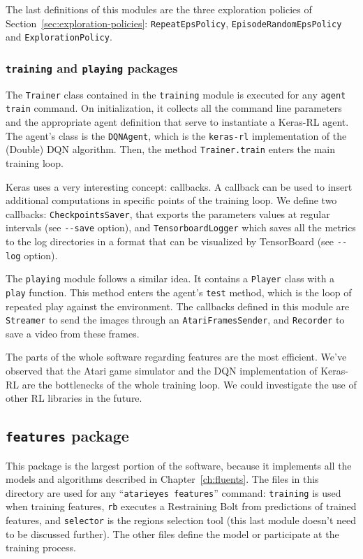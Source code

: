 The last definitions of this modules are the three exploration policies of
Section~\ref{sec:exploration-policies}: \texttt{RepeatEpsPolicy},
\texttt{EpisodeRandomEpsPolicy} and \texttt{ExplorationPolicy}.


\subsubsection*{\texttt{training} and \texttt{playing} packages}

The \texttt{Trainer} class contained in the \texttt{training} module is
executed for any \lstinline[style=inlinepy]|agent train| command. On
initialization, it collects all the command line parameters and the
appropriate agent definition that serve to instantiate a Keras-RL agent. The
agent's class is the \texttt{DQNAgent}, which is the \texttt{keras-rl}
implementation of the (Double) DQN algorithm. Then, the method
\verb|Trainer.train| enters the main training loop.

Keras uses a very interesting concept: callbacks. A callback can be used to
insert additional computations in specific points of the training loop.  We
define two callbacks: \texttt{CheckpointsSaver}, that exports the parameters
values at regular intervals (see \verb|--save| option), and
\texttt{TensorboardLogger} which saves all the metrics to the log directories
in a format that can be visualized by TensorBoard (see \verb|--log| option).

The \texttt{playing} module follows a similar idea. It contains a
\texttt{Player} class with a \texttt{play} function. This method enters the
agent's \texttt{test} method, which is the loop of repeated play against the
environment. The callbacks defined in this module are \texttt{Streamer} to
send the images through an \texttt{AtariFramesSender}, and \texttt{Recorder}
to save a video from these frames.

The parts of the whole software regarding features are the most efficient.
We've observed that the Atari game simulator and the DQN implementation of
Keras-RL are the bottlenecks of the whole training loop. We could investigate
the use of other RL libraries in the future.


\subsection{\texttt{features} package}

This package is the largest portion of the software, because it implements all
the models and algorithms described in Chapter~\ref{ch:fluents}. The files in
this directory are used for any
``\lstinline[style=inlinesh]|atarieyes features|'' command: \texttt{training}
is used when training features, \texttt{rb} executes a Restraining Bolt from
predictions of trained features, and \texttt{selector} is the regions
selection tool (this last module doesn't need to be discussed further).
The other files define the model or participate at the training process.


